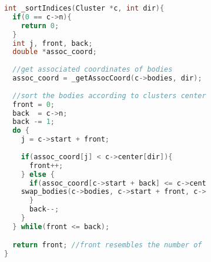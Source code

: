 \begin{figure}[t]
\begin{subfigure}{0.9\textwidth}
\begin{lstlisting}[language=C, label=lst:sort, caption={Diese Methode nimmt die Sortierung der \code{bodies} anhand einer vorgegebenen Koordinatenrichtung vor.}]
int _sortIndices(Cluster *c, int dir){
  if(0 == c->n){
    return 0;
  }
  int j, front, back;
  double *assoc_coord;
  
  //get associated coordinates of bodies
  assoc_coord = _getAssocCoord(c->bodies, dir);
  
  //sort the bodies according to clusters center
  front = 0;
  back  = c->n;
  back -= 1;
  do {
    j = c->start + front;
    
    if(assoc_coord[j] < c->center[dir]){
      front++;
    } else {
      if(assoc_coord[c->start + back] <= c->center[dir]){
	swap_bodies(c->bodies, c->start + front, c->start + back);
      }
      back--;
    }
  } while(front <= back);

  return front; //front resembles the number of elements in the left half
}
\end{lstlisting}
\end{subfigure}
\end{figure}
